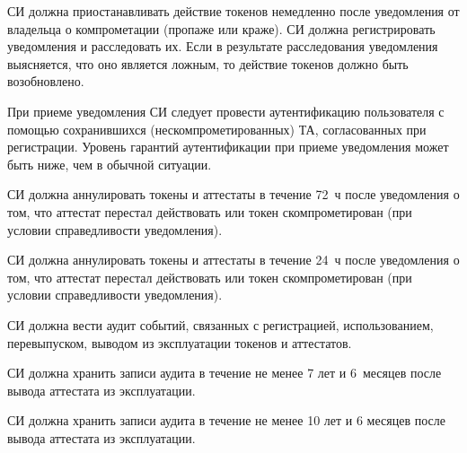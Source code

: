 


СИ должна приостанавливать действие токенов немедленно после 
уведомления от владельца о компрометации (пропаже или краже).
%
СИ должна регистрировать уведомления и расследовать их.
%
Если в результате расследования уведомления выясняется, что оно является 
ложным, то действие токенов должно быть возобновлено.

\begin{note*}
При приеме уведомления СИ следует провести аутентификацию пользователя
с помощью сохранившихся (нескомпрометированных) ТА, согласованных при 
регистрации. 
%
Уровень гарантий аутентификации при приеме уведомления может быть ниже, 
чем в обычной ситуации.
\end{note*}


СИ должна аннулировать токены и аттестаты в течение 72~ч 
после уведомления о том, что аттестат перестал действовать 
или токен скомпрометирован (при условии справедливости уведомления).

СИ должна аннулировать токены и аттестаты в течение 24~ч
после уведомления о том, что аттестат перестал действовать 
или токен скомпрометирован (при условии справедливости уведомления). 

СИ должна вести аудит событий, связанных с регистрацией, использованием, 
перевыпуском, выводом из эксплуатации токенов и аттестатов.  


СИ должна хранить записи аудита в течение не менее 7 лет и 6~месяцев после 
вывода аттестата из эксплуатации.  

СИ должна хранить записи аудита в течение не менее 10 лет и 6 месяцев 
после вывода аттестата из эксплуатации.  
